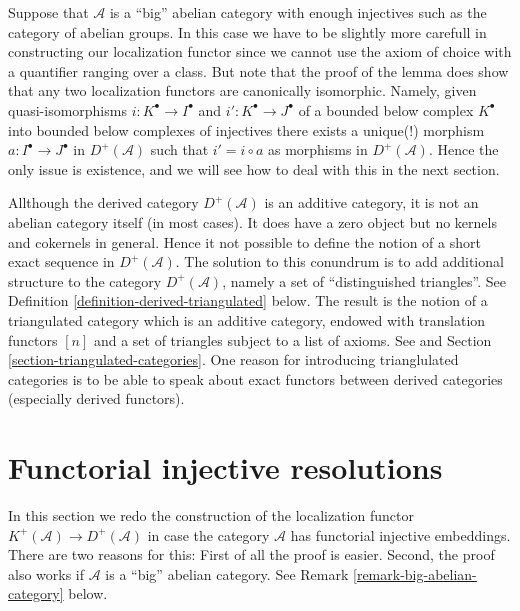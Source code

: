 \begin{remark}
\label{remark-big-localization}
Suppose that $\mathcal{A}$ is a ``big'' abelian category with enough injectives
such as the category of abelian groups. In this case we have to be slightly
more carefull in constructing our localization functor since we cannot use
the axiom of choice with a quantifier ranging over a class. But note that
the proof of the lemma does show that any two localization functors are
canonically isomorphic. Namely, given quasi-isomorphisms
$i : K^\bullet \to I^\bullet$ and $i' : K^\bullet \to J^\bullet$ of
a bounded below complex $K^\bullet$ into bounded below complexes of injectives
there exists a unique(!) morphism $a : I^\bullet \to J^\bullet$
in $D^{+}(\mathcal{A})$ such that $i' = i \circ a$ as morphisms in
$D^{+}(\mathcal{A})$. Hence the only issue is existence, and we will see how
to deal with this in the next section.
\end{remark}

\begin{remark}
\label{remark-failure}
Allthough the derived category $D^{+}(\mathcal{A})$ is an additive category,
it is not an abelian category itself (in most cases). It does have a zero
object but no kernels and cokernels in general. Hence it not possible to define
the notion of a short exact sequence in $D^{+}(\mathcal{A})$. The solution to
this conundrum is to add additional structure to the category
$D^{+}(\mathcal{A})$, namely a set of ``distinguished triangles''.
See Definition \ref{definition-derived-triangulated} below.
The result is the notion of a triangulated category which is an
additive category, endowed with translation functors $[n]$
and a set of triangles subject to a list of axioms.
See \cite{Verdier} and Section \ref{section-triangulated-categories}.
One reason for introducing trianglulated categories is to be able to speak
about exact functors between derived categories (especially derived
functors).
\end{remark}





\section{Functorial injective resolutions}
\label{section-functorial-injective-resolutions}

\noindent
In this section we redo the construction of the localization functor
$K^{+}(\mathcal{A}) \to D^{+}(\mathcal{A})$ in case the
category $\mathcal{A}$ has functorial injective embeddings.
There are two reasons for this: First of all the proof is easier.
Second, the proof also works if $\mathcal{A}$ is a ``big'' abelian
category. See Remark \ref{remark-big-abelian-category} below.

